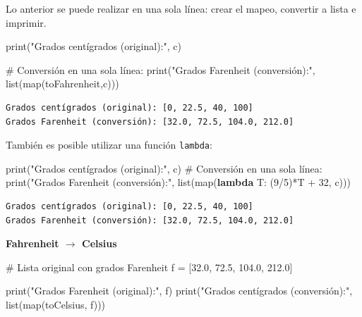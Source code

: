 \documentclass[
  spanish,
  letterpaper,
]{scrbook}
\newenvironment{Shaded}{\begin{snugshade}}{\end{snugshade}}
\newcommand{\BuiltInTok}[1]{\textcolor[rgb]{0.00,0.23,0.31}{#1}}
\newcommand{\CommentTok}[1]{\textcolor[rgb]{0.37,0.37,0.37}{#1}}
\newcommand{\DecValTok}[1]{\textcolor[rgb]{0.68,0.00,0.00}{#1}}
\newcommand{\FloatTok}[1]{\textcolor[rgb]{0.68,0.00,0.00}{#1}}
\newcommand{\KeywordTok}[1]{\textcolor[rgb]{0.00,0.23,0.31}{\textbf{#1}}}
\newcommand{\NormalTok}[1]{\textcolor[rgb]{0.00,0.23,0.31}{#1}}
\newcommand{\OperatorTok}[1]{\textcolor[rgb]{0.37,0.37,0.37}{#1}}
\newcommand{\StringTok}[1]{\textcolor[rgb]{0.13,0.47,0.30}{#1}}
\theoremstyle{definition}
\theoremstyle{remark}
\begin{document}
Lo anterior se puede realizar en una sola línea: crear el mapeo,
convertir a lista e imprimir.

\begin{Shaded}
\begin{Highlighting}[]
\BuiltInTok{print}\NormalTok{(}\StringTok{"Grados centígrados (original):"}\NormalTok{, c)}

\CommentTok{\# Conversión en una sola línea:}
\BuiltInTok{print}\NormalTok{(}\StringTok{"Grados Farenheit (conversión):"}\NormalTok{, }\BuiltInTok{list}\NormalTok{(}\BuiltInTok{map}\NormalTok{(toFahrenheit,c)))}
\end{Highlighting}
\end{Shaded}

\begin{verbatim}
Grados centígrados (original): [0, 22.5, 40, 100]
Grados Farenheit (conversión): [32.0, 72.5, 104.0, 212.0]
\end{verbatim}

También es posible utilizar una función \texttt{lambda}:

\begin{Shaded}
\begin{Highlighting}[]
\BuiltInTok{print}\NormalTok{(}\StringTok{"Grados centígrados (original):"}\NormalTok{, c)}
\CommentTok{\# Conversión en una sola línea:}
\BuiltInTok{print}\NormalTok{(}\StringTok{"Grados Farenheit (conversión):"}\NormalTok{, }\BuiltInTok{list}\NormalTok{(}\BuiltInTok{map}\NormalTok{(}\KeywordTok{lambda}\NormalTok{ T: (}\DecValTok{9}\OperatorTok{/}\DecValTok{5}\NormalTok{)}\OperatorTok{*}\NormalTok{T }\OperatorTok{+} \DecValTok{32}\NormalTok{, c)))}
\end{Highlighting}
\end{Shaded}

\begin{verbatim}
Grados centígrados (original): [0, 22.5, 40, 100]
Grados Farenheit (conversión): [32.0, 72.5, 104.0, 212.0]
\end{verbatim}

\textbf{Fahrenheit \(\to\) Celsius}

\begin{Shaded}
\begin{Highlighting}[]
\CommentTok{\# Lista original con grados Farenheit}
\NormalTok{f }\OperatorTok{=}\NormalTok{ [}\FloatTok{32.0}\NormalTok{, }\FloatTok{72.5}\NormalTok{, }\FloatTok{104.0}\NormalTok{, }\FloatTok{212.0}\NormalTok{]}

\BuiltInTok{print}\NormalTok{(}\StringTok{"Grados Farenheit (original):"}\NormalTok{, f)}
\BuiltInTok{print}\NormalTok{(}\StringTok{"Grados centígrados (conversión):"}\NormalTok{, }\BuiltInTok{list}\NormalTok{(}\BuiltInTok{map}\NormalTok{(toCelsius, f)))}
\end{Highlighting}
\end{Shaded}
\end{document}
